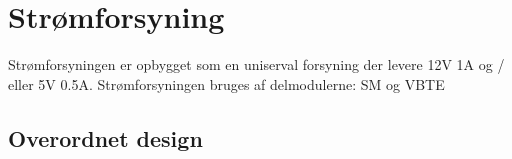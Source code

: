 \chapter{Strømforsyning}
Strømforsyningen er opbygget som en uniserval forsyning der levere 12V 1A og / eller 5V 0.5A. Strømforsyningen bruges af delmodulerne: SM og VBTE

\section{Overordnet design}